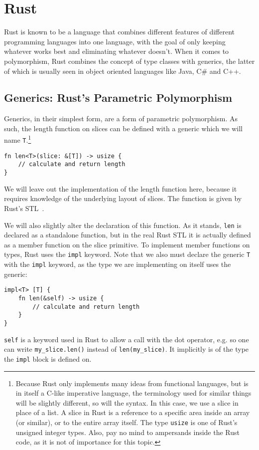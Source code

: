 \section{Rust}

Rust is known to be a language that combines different features of different programming languages into one language, with the goal of only keeping whatever works best and eliminating whatever doesn't. When it comes to polymorphism, Rust combines the concept of type classes with generics, the latter of which is usually seen in object oriented languages like Java, C\# and C++.

\subsection{Generics: Rust's Parametric Polymorphism}

Generics, in their simplest form, are a form of parametric polymorphism. As such, the length function on slices can be defined with a generic which we will name \verb|T|.\footnote{Because Rust only implements many ideas from functional languages, but is in itself a C-like imperative language, the terminology used for similar things will be slightly different, so will the syntax. In this case, we use a slice in place of a list. A slice in Rust is a reference to a specific area inside an array (or similar), or to the entire array itself. The type \verb|usize| is one of Rust's unsigned integer types. Also, pay no mind to ampersands inside the Rust code, as it is not of importance for this topic.}
\begin{verbatim}
fn len<T>(slice: &[T]) -> usize {
    // calculate and return length
}
\end{verbatim}
We will leave out the implementation of the length function here, because it requires knowledge of the underlying layout of slices. The function is given by Rust's STL~\cite{rust-len}.

We will also slightly alter the declaration of this function. As it stands, \verb|len| is declared as a standalone function, but in the real Rust STL it is actually defined as a member function on the slice primitive. To implement member functions on types, Rust uses the \verb|impl| keyword. Note that we also must declare the generic \verb|T| with the \verb|impl| keyword, as the type we are implementing on itself uses the generic:
\begin{verbatim}
impl<T> [T] {
    fn len(&self) -> usize {
        // calculate and return length
    }
}
\end{verbatim}
\verb|self| is a keyword used in Rust to allow a call with the dot operator, e.g. so one can write \verb|my_slice.len()| instead of \verb|len(my_slice)|. It implicitly is of the type the \verb|impl| block is defined on.

